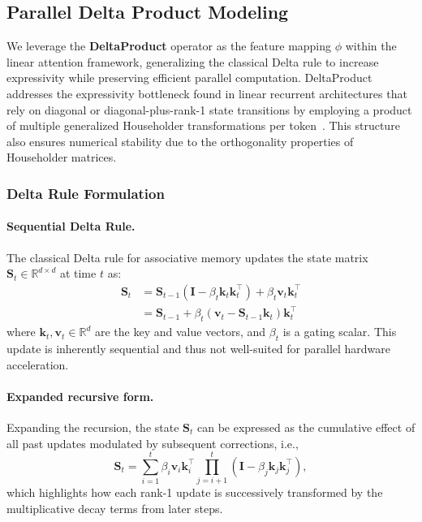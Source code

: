 \documentclass[10pt,a4paper]{article}
\begin{document}
\subsection{Parallel Delta Product Modeling}

We leverage the \textbf{DeltaProduct} operator as the feature mapping $\phi$ within the linear attention framework, generalizing the classical Delta rule to increase expressivity while preserving efficient parallel computation. DeltaProduct addresses the expressivity bottleneck found in linear recurrent architectures that rely on diagonal or diagonal-plus-rank-1 state transitions by employing a product of multiple generalized Householder transformations per token~\cite{siems2025deltaproduct}. This structure also ensures numerical stability due to the orthogonality properties of Householder matrices.

\subsubsection{Delta Rule Formulation}


\paragraph{Sequential Delta Rule.}

The classical Delta rule for associative memory updates the state matrix $\mathbf{S}_t \in \mathbb{R}^{d \times d}$ at time $t$ as:
\begin{align}
    \mathbf{S}_t &= \mathbf{S}_{t-1} \left(\mathbf{I}  - \beta_t \mathbf{k}_t  \mathbf{k}_t^\top \right) + \beta_t \mathbf{v}_t \mathbf{k}_t^\top \\
    &= \mathbf{S}_{t-1} + \beta_t \left( \mathbf{v}_t - \mathbf{S}_{t-1} \mathbf{k}_t \right) \mathbf{k}_t^\top
    \label{eq:deltarule}
\end{align}
where $\mathbf{k}_t, \mathbf{v}_t \in \mathbb{R}^d$ are the key and value vectors, and $\beta_t$ is a gating scalar. This update is inherently sequential and thus not well-suited for parallel hardware acceleration.

\paragraph{Expanded recursive form.}

Expanding the recursion, the state $\mathbf{S}_t$ can be expressed as the cumulative effect of all past updates modulated by subsequent corrections, i.e.,
\begin{equation}
    \mathbf{S}_t = \sum_{i=1}^t \beta_i \mathbf{v}_i \mathbf{k}_i^\top \prod_{j=i+1}^t \left( \mathbf{I} - \beta_j \mathbf{k}_j \mathbf{k}_j^\top \right),
\end{equation}
which highlights how each rank-1 update is successively transformed by the multiplicative decay terms from later steps.
\end{document}
